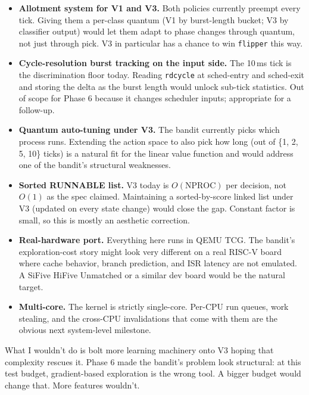 \documentclass[11pt]{article}
\begin{document}
\begin{itemize}
  \item \textbf{Allotment system for V1 and V3.} Both policies currently
  preempt every tick. Giving them a per-class quantum (V1 by burst-length
  bucket; V3 by classifier output) would let them adapt to phase changes
  through quantum, not just through pick. V3 in particular has a chance to
  win \texttt{flipper} this way.

  \item \textbf{Cycle-resolution burst tracking on the input side.} The
  10\,ms tick is the discrimination floor today. Reading \texttt{rdcycle}
  at sched-entry and sched-exit and storing the delta as the burst length
  would unlock sub-tick statistics. Out of scope for Phase 6 because it
  changes scheduler inputs; appropriate for a follow-up.

  \item \textbf{Quantum auto-tuning under V3.} The bandit currently picks
  which process runs. Extending the action space to also pick how long
  (out of \{1, 2, 5, 10\} ticks) is a natural fit for the linear value
  function and would address one of the bandit's structural weaknesses.

  \item \textbf{Sorted RUNNABLE list.} V3 today is $O(\text{NPROC})$ per
  decision, not $O(1)$ as the spec claimed. Maintaining a sorted-by-score
  linked list under V3 (updated on every state change) would close the gap.
  Constant factor is small, so this is mostly an aesthetic correction.

  \item \textbf{Real-hardware port.} Everything here runs in QEMU TCG.
  The bandit's exploration-cost story might look very different on a real
  RISC-V board where cache behavior, branch prediction, and ISR latency are
  not emulated. A SiFive HiFive Unmatched or a similar dev board would be
  the natural target.

  \item \textbf{Multi-core.} The kernel is strictly single-core. Per-CPU
  run queues, work stealing, and the cross-CPU invalidations that come with
  them are the obvious next system-level milestone.
\end{itemize}

What I wouldn't do is bolt more learning machinery onto V3 hoping that
complexity rescues it. Phase 6 made the bandit's problem look structural:
at this test budget, gradient-based exploration is the wrong tool. A
bigger budget would change that. More features wouldn't.



\end{document}
